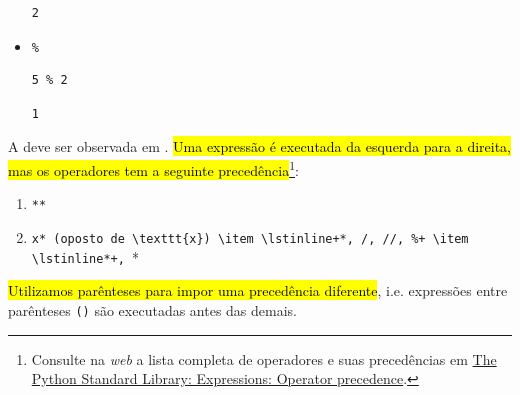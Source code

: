 \begin{itemize}
\begin{verbatim}
2
\end{verbatim}

\item \texttt{\%} 

\begin{lstlisting}[xrightmargin=2.5em]
5 % 2
\end{lstlisting}

\begin{verbatim}
1
\end{verbatim}

\end{itemize}

A  deve ser observada em {\python}. \hl{Uma expressão é executada da esquerda para a direita, mas os operadores tem a seguinte precedência}\footnote{Consulte na \textit{web} a lista completa de operadores e suas precedências em \href{https://docs.python.org/3/reference/expressions.html\#operator-precedence}{The Python Standard Library: Expressions: Operator precedence}.}:

\begin{enumerate}
\item \lstinline+**+
\item \lstinline*-x* (oposto de \texttt{x})
\item \lstinline+*, /, //, %+
\item \lstinline*+, -*
\end{enumerate}

\hl{Utilizamos parênteses para impor uma precedência diferente}, i.e. expressões entre parênteses \lstinline+()+ são executadas antes das demais.

